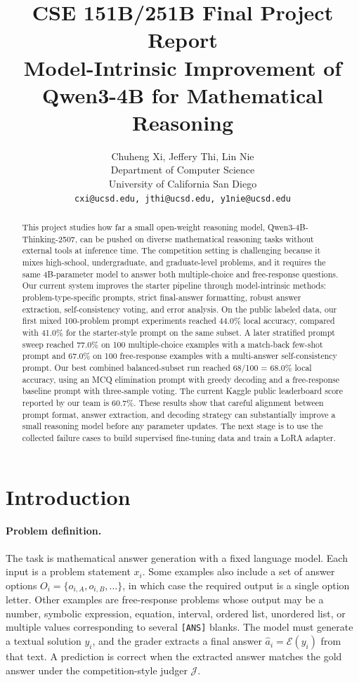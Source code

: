 \documentclass{article}
\title{
CSE 151B/251B Final Project Report\\
{\large Model-Intrinsic Improvement of Qwen3-4B for Mathematical Reasoning}
}
\author{%
  Chuheng Xi, Jeffery Thi, Lin Nie\\
  Department of Computer Science\\
  University of California San Diego\\
  \texttt{cxi@ucsd.edu, jthi@ucsd.edu, y1nie@ucsd.edu}
}
\newcommand{\model}{Qwen3-4B-Thinking-2507}
\newcommand{\answerextract}{\mathcal{E}}
\newcommand{\scorefn}{\mathcal{J}}
\begin{document}
\maketitle

\begin{abstract}
This project studies how far a small open-weight reasoning model, \model, can be pushed on diverse mathematical reasoning tasks without external tools at inference time. The competition setting is challenging because it mixes high-school, undergraduate, and graduate-level problems, and it requires the same 4B-parameter model to answer both multiple-choice and free-response questions. Our current system improves the starter pipeline through model-intrinsic methods: problem-type-specific prompts, strict final-answer formatting, robust answer extraction, self-consistency voting, and error analysis. On the public labeled data, our first mixed 100-problem prompt experiments reached 44.0\% local accuracy, compared with 41.0\% for the starter-style prompt on the same subset. A later stratified prompt sweep reached 77.0\% on 100 multiple-choice examples with a match-back few-shot prompt and 67.0\% on 100 free-response examples with a multi-answer self-consistency prompt. Our best combined balanced-subset run reached 68/100 = 68.0\% local accuracy, using an MCQ elimination prompt with greedy decoding and a free-response baseline prompt with three-sample voting. The current Kaggle public leaderboard score reported by our team is 60.7\%. These results show that careful alignment between prompt format, answer extraction, and decoding strategy can substantially improve a small reasoning model before any parameter updates. The next stage is to use the collected failure cases to build supervised fine-tuning data and train a LoRA adapter.
\end{abstract}

\section{Introduction}
\label{sec:intro}

\paragraph{Problem definition.}
The task is mathematical answer generation with a fixed language model. Each input is a problem statement $x_i$. Some examples also include a set of answer options $O_i = \{o_{i,A}, o_{i,B}, \ldots\}$, in which case the required output is a single option letter. Other examples are free-response problems whose output may be a number, symbolic expression, equation, interval, ordered list, unordered list, or multiple values corresponding to several \texttt{[ANS]} blanks. The model must generate a textual solution $y_i$, and the grader extracts a final answer $\hat{a}_i = \answerextract(y_i)$ from that text. A prediction is correct when the extracted answer matches the gold answer under the competition-style judger $\scorefn$.
\end{document}
